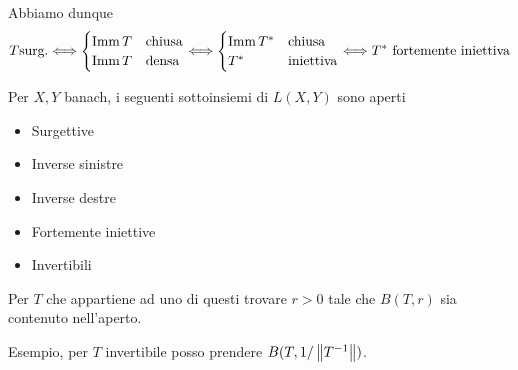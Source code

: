 Abbiamo dunque
\[T\text{surg.}\Longleftrightarrow \begin{cases}
    \operatorname{Imm} T&\text{chiusa}\\
    \operatorname{Imm} T&\text{densa}
\end{cases} \Longleftrightarrow \begin{cases}
    \operatorname{Imm} T^\ast&\text{chiusa}\\
    T^\ast&\text{iniettiva}
\end{cases}\Longleftrightarrow T^\ast\text{ fortemente iniettiva}\]


\begin{exercise}
Per $X,Y$ banach, i seguenti sottoinsiemi di $L(X,Y)$ sono aperti
\begin{itemize}
    \item Surgettive
    \item Inverse sinistre
    \item Inverse destre
    \item Fortemente iniettive
    \item Invertibili
\end{itemize}
Per $T$ che appartiene ad uno di questi trovare $r>0$ tale che $B(T,r)$ sia contenuto nell'aperto.
\end{exercise}
\begin{solution}
Esempio, per $T$ invertibile posso prendere $B(T,1/\left\Vert{T^{-1}}\right\Vert)$.
\end{solution}